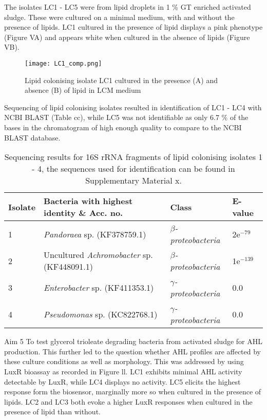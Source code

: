 \documentclass[11pt]{article}
\begin{document}
The isolates LC1 - LC5 were from lipid droplets in 1 \% GT enriched activated sludge. These were cultured on a minimal medium, with and without the presence of lipids. LC1 cultured in the presence of lipid displays a pink phenotype (Figure VA) and appears white when cultured in the absence of lipids (Figure VB).

\begin{figure}
\texttt{[image: LC1\_comp.png]}
\caption{Lipid colonising isolate LC1 cultured in the presence (A) and absence (B) of lipid in LCM medium}
\end{figure}



Sequencing of lipid colonising isolates resulted in identification of LC1 - LC4 with NCBI BLAST (Table cc), while LC5 was not identifiable as only 6.7 \% of the bases in the chromatogram of high enough quality to compare to the NCBI BLAST database.
	
\begin{table}
\caption{Sequencing results for 16S rRNA fragments of lipid colonising isolates 1 - 4, the sequences used for identification can be found in Supplementary Material  x.}
\begin{tabular}{ | l | p{7.8cm} | p{3cm} | l | }
\hline
Isolate & Bacteria with highest identity \& Acc. no. & Class & E-value \\
\hline
1 &  \emph{Pandoraea} sp. (KF378759.1) & \emph{$\beta$-proteobacteria} & 2e$^{-79}$ \\
\hline
2 & Uncultured \emph{Achromobacter} sp. (KF448091.1) & \emph{$\beta$-proteobacteria} & 1e$^{-139}$ \\
\hline
3 & \emph{Enterobacter} sp. (KF411353.1) & \emph{$\gamma$-proteobacteria} & 0.0 \\
\hline
4 & \emph{Pseudomonas} sp. (KC822768.1) & \emph{$\gamma$-proteobacteria} & 0.0 \\
\hline
\end{tabular}
\end{table}
\FloatBarrier
Aim 5 To test glycerol trioleate degrading bacteria from activated sludge for AHL production.
This further led to the question whether AHL profiles are affected by these culture conditions as well as morphology. This was addressed by using LuxR bioassay as recorded in Figure ll. LC1 exhibits minimal AHL activity detectable by LuxR, while LC4 displays no activity. LC5 elicits the highest response form the biosensor, marginally more so when cultured in the presence of lipids. LC2 and LC3 both evoke a higher LuxR responses when cultured in the presence of lipid than without.
\end{document}
